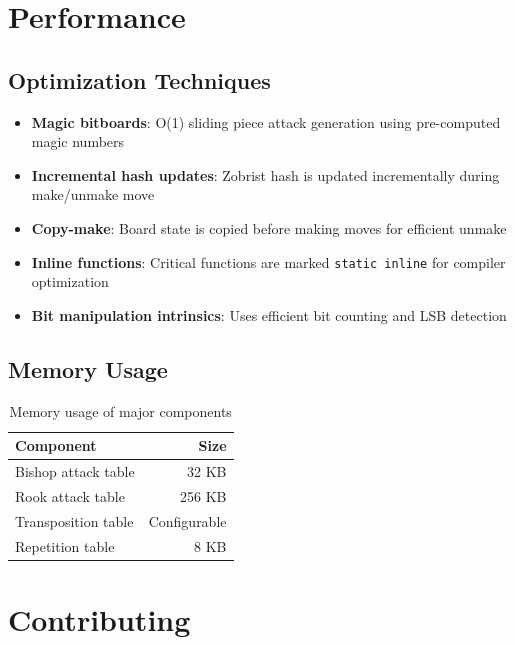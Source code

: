 \documentclass[11pt,a4paper]{report}
\begin{document}
\chapter{Performance}

\section{Optimization Techniques}

\begin{itemize}
    \item \textbf{Magic bitboards}: O(1) sliding piece attack generation using pre-computed magic numbers
    \item \textbf{Incremental hash updates}: Zobrist hash is updated incrementally during make/unmake move
    \item \textbf{Copy-make}: Board state is copied before making moves for efficient unmake
    \item \textbf{Inline functions}: Critical functions are marked \texttt{static inline} for compiler optimization
    \item \textbf{Bit manipulation intrinsics}: Uses efficient bit counting and LSB detection
\end{itemize}

\section{Memory Usage}

\begin{table}[h]
\centering
\begin{tabular}{lr}
\toprule
\textbf{Component} & \textbf{Size} \\
\midrule
Bishop attack table & 32 KB \\
Rook attack table & 256 KB \\
Transposition table & Configurable \\
Repetition table & 8 KB \\
\bottomrule
\end{tabular}
\caption{Memory usage of major components}
\end{table}

\chapter{Contributing}
\end{document}
